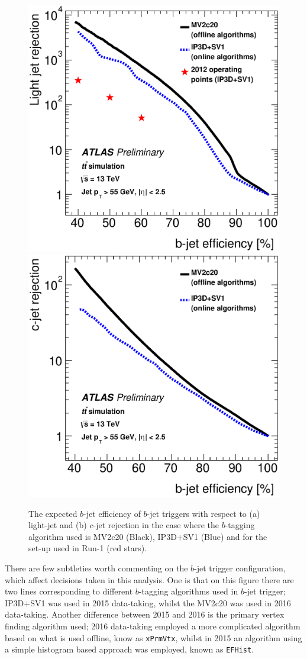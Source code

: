 \begin{figure}[!ht]
  \begin{center}
    \includegraphics[width=0.48\linewidth, angle=0]{figs/Trigger/trig-bTrig_perf_light.eps}
    \includegraphics[width=0.48\linewidth, angle=0]{figs/Trigger/trig-bTrig_perf_charm.eps}
  \end{center}
  \caption{The expected $b$-jet efficiency of $b$-jet triggers with respect to (a) light-jet and (b) $c$-jet rejection
    in the case where the $b$-tagging algorithm used is MV2c20 (Black), IP3D+SV1 (Blue) and for the set-up used in Run-1 (red stars).}
  \label{fig:trig-bTrig_perf}
\end{figure}

There are few subtleties worth commenting on the $b$-jet trigger configuration, which affect decisions taken in this analysis.
One is that on this figure there are two lines corresponding to different $b$-tagging algorithms used in $b$-jet trigger;
IP3D+SV1 was used in 2015 data-taking,
whilst the MV2c20 was used in 2016 data-taking.
Another difference between 2015 and 2016 is the primary vertex finding algorithm used;
2016 data-taking employed a more complicated algorithm based on what is used offline, know as \verb|xPrmVtx|,
whilst in 2015 an algorithm using a simple histogram based approach was employed, known as \verb|EFHist|. 

